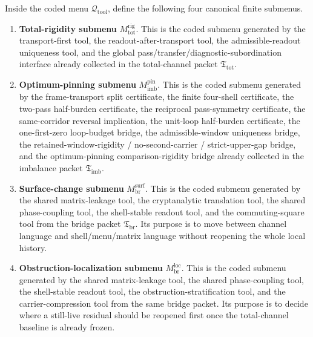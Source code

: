\begin{definition}
\label{def:first-canonical-finite-submenus-qtool}
Inside the coded menu \(\mathcal Q_{\mathrm{tool}}\), define the following four canonical finite submenus.
\begin{enumerate}[leftmargin=2em]
  \item \textbf{Total-rigidity submenu} \(M^{\mathrm{rig}}_{\mathrm{tot}}\). This is the coded submenu generated by the transport-first tool, the readout-after-transport tool, the admissible-readout uniqueness tool, and the global pass/transfer/diagnostic-subordination interface already collected in the total-channel packet \(\mathfrak T_{\mathrm{tot}}\).

  \item \textbf{Optimum-pinning submenu} \(M^{\mathrm{pin}}_{\mathrm{imb}}\). This is the coded submenu generated by the frame-transport split certificate, the finite four-shell certificate, the two-pass half-burden certificate, the reciprocal pass-symmetry certificate, the same-corridor reversal implication, the unit-loop half-burden certificate, the one-first-zero loop-budget bridge, the admissible-window uniqueness bridge, the retained-window-rigidity / no-second-carrier / strict-upper-gap bridge, and the optimum-pinning comparison-rigidity bridge already collected in the imbalance packet \(\mathfrak T_{\mathrm{imb}}\).

  \item \textbf{Surface-change submenu} \(M^{\mathrm{surf}}_{\mathrm{br}}\). This is the coded submenu generated by the shared matrix-leakage tool, the cryptanalytic translation tool, the shared phase-coupling tool, the shell-stable readout tool, and the commuting-square tool from the bridge packet \(\mathfrak T_{\mathrm{br}}\). Its purpose is to move between channel language and shell/menu/matrix language without reopening the whole local history.

  \item \textbf{Obstruction-localization submenu} \(M^{\mathrm{loc}}_{\mathrm{br}}\). This is the coded submenu generated by the shared matrix-leakage tool, the shared phase-coupling tool, the shell-stable readout tool, the obstruction-stratification tool, and the carrier-compression tool from the same bridge packet. Its purpose is to decide where a still-live residual should be reopened first once the total-channel baseline is already frozen.
\end{enumerate}
\end{definition}

